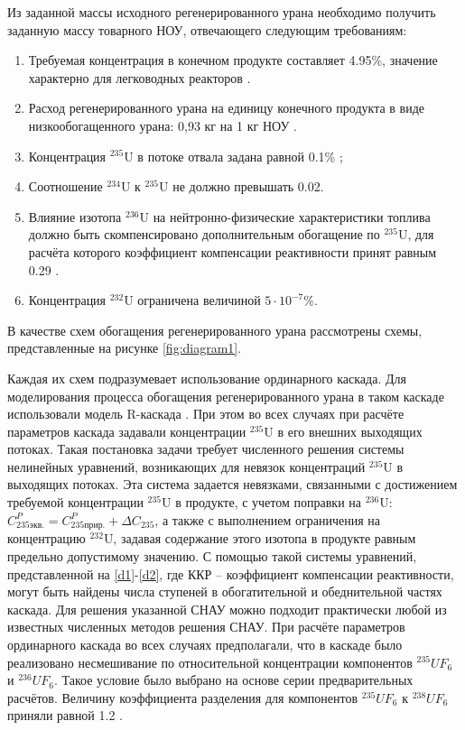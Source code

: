 Из заданной массы исходного регенерированного урана необходимо получить заданную массу товарного НОУ, отвечающего следующим требованиям:

\begin{enumerate}
  \item Требуемая концентрация в конечном продукте составляет 4.95\%, значение характерно для легководных реакторов \cite{solovevaCennostiOYaTKak2019}.
  \item Расход регенерированного урана на единицу конечного продукта в виде низкообогащенного урана: 0,93 кг на 1 кг НОУ \cite{smirnovApplyingEnrichmentCapacities2018}.
  \item Концентрация $^{235}$U в потоке отвала задана равной 0.1\% \cite{smirnovEvolutionIsotopicComposition2012};
  \item Соотношение $^{234}$U к $^{235}$U не должно превышать 0.02.
  \item Влияние изотопа $^{236}$U на нейтронно-физические характеристики топлива должно быть скомпенсировано дополнительным обогащение по $^{235}$U, для расчёта которого коэффициент компенсации реактивности принят равным 0.29 \cite{smirnovApplyingEnrichmentCapacities2018}.
  \item Концентрация $^{232}$U ограничена величиной $5\cdot10^{-7}$\%.
\end{enumerate}

В качестве схем обогащения регенерированного урана рассмотрены схемы, представленные на рисунке \ref{fig:diagram1}.


Каждая их схем подразумевает использование ординарного каскада. Для моделирования процесса обогащения регенерированного урана в таком каскаде использовали модель R-каскада \cite{sulaberidzeTeoriyaKaskadovDlya2011}. При этом во всех случаях при расчёте параметров каскада задавали концентрации $^{235}$U в его внешних выходящих потоках. Такая постановка задачи требует численного решения системы нелинейных уравнений, возникающих для невязок концентраций $^{235}$U в выходящих потоках. Эта система задается невязками, связанными с достижением требуемой концентрации $^{235}$U в продукте, с учетом поправки на $^{236}$U: $C_{235 экв.}^{P}=C_{235 прир.}^{P}+\Delta C_{235}$, а также с выполнением ограничения на концентрацию $^{232}$U, задавая содержание этого изотопа в продукте равным предельно допустимому значению. С помощью такой системы уравнений, представленной на \ref{d1}-\ref{d2}, где ККР -- коэффициент компенсации реактивности, могут быть найдены числа ступеней в обогатительной и обеднительной частях каскада. Для решения указанной СНАУ можно подходит практически любой из известных численных методов решения СНАУ. 
При расчёте параметров ординарного каскада во всех случаях предполагали, что в каскаде было реализовано несмешивание по относительной концентрации компонентов $^{235}UF_6$ и $^{236}UF_6$. Такое условие было выбрано на основе серии предварительных расчётов. Величину коэффициента разделения для компонентов  $^{235}UF_6$ к $^{238}UF_6$ приняли равной 1.2  \cite{smirnovEvolutionIsotopicComposition2012}. 

